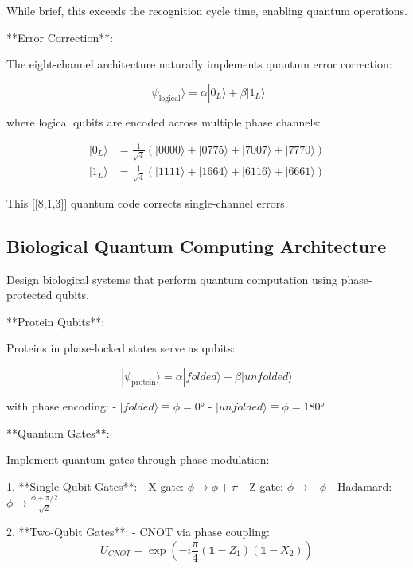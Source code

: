 \documentclass[12pt,a4paper]{report}
\begin{document}
While brief, this exceeds the recognition cycle time, enabling quantum operations.

**Error Correction**:

The eight-channel architecture naturally implements quantum error correction:

\begin{equation}
|\psi_{\text{logical}}\rangle = \alpha|0_L\rangle + \beta|1_L\rangle
\end{equation}

where logical qubits are encoded across multiple phase channels:

\begin{align}
|0_L\rangle &= \frac{1}{\sqrt{4}}(|0000\rangle + |0775\rangle + |7007\rangle + |7770\rangle) \\
|1_L\rangle &= \frac{1}{\sqrt{4}}(|1111\rangle + |1664\rangle + |6116\rangle + |6661\rangle)
\end{align}

This [[8,1,3]] quantum code corrects single-channel errors.

\subsection{Biological Quantum Computing Architecture}

Design biological systems that perform quantum computation using phase-protected qubits.

**Protein Qubits**:

Proteins in phase-locked states serve as qubits:

\begin{equation}
|\psi_{\text{protein}}\rangle = \alpha|folded\rangle + \beta|unfolded\rangle
\end{equation}

with phase encoding:
- $|folded\rangle \equiv \phi = 0°$
- $|unfolded\rangle \equiv \phi = 180°$

**Quantum Gates**:

Implement quantum gates through phase modulation:

1. **Single-Qubit Gates**:
   - X gate: $\phi \rightarrow \phi + \pi$
   - Z gate: $\phi \rightarrow -\phi$
   - Hadamard: $\phi \rightarrow \frac{\phi + \pi/2}{\sqrt{2}}$

2. **Two-Qubit Gates**:
   - CNOT via phase coupling:
   \begin{equation}
   U_{CNOT} = \exp\left(-i\frac{\pi}{4}(\mathbb{1} - Z_1)(\mathbb{1} - X_2)\right)
   \end{equation}
\end{document}

